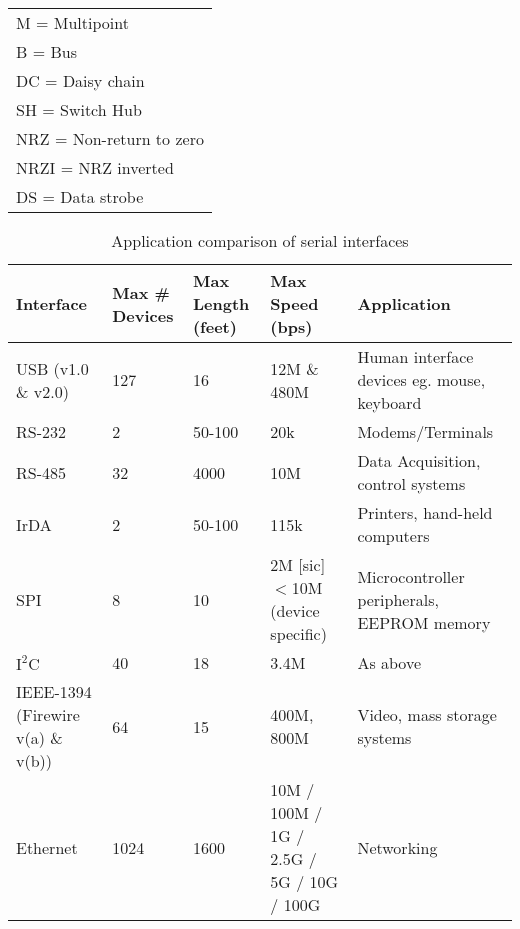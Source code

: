 \begin{table}[H]
\begin{center}
\begin{tabular} { | m{4cm} | m{1cm} | m{1cm} | m{2.5cm} | m{1cm} | m{1cm} | m{1.5cm} | }
        \multicolumn{7}{l}{M = Multipoint}\\
        \multicolumn{7}{l}{B = Bus}\\
        \multicolumn{7}{l}{DC = Daisy chain}\\
        \multicolumn{7}{l}{SH = Switch Hub}\\
        \multicolumn{7}{l}{NRZ = Non-return to zero}\\
        \multicolumn{7}{l}{NRZI = NRZ inverted}\\
        \multicolumn{7}{l}{DS = Data strobe}\\
        \end{tabular}
    \end{center}
\end{table}

\begin{table}[H]
    \caption{Application comparison of serial interfaces}
    \label{table:serial-app-comp}
    \begin{center}
        \begin{tabular} { | m{3cm} | m{2cm} | m{2cm} | m{2cm} | m{5cm} | }
        \hline
        Interface & Max \# Devices & Max Length (feet) & Max Speed (bps) & Application\\
        \hline
        USB (v1.0 \& v2.0) & 127 & 16 & 12M \& 480M & Human interface devices eg. mouse, keyboard\\
        \hline
        RS-232 & 2 & 50-100 & 20k & Modems/Terminals\\
        \hline
        RS-485 & 32 & 4000 & 10M & Data Acquisition, control systems\\
        \hline
        IrDA & 2 & 50-100 & 115k & Printers, hand-held computers\\
        \hline
        SPI & 8 & 10 & 2M [sic] $<$10M (device specific) & Microcontroller peripherals, EEPROM
        memory\\
        \hline
        $\textrm{I}^2\textrm{C}$ & 40 & 18 & 3.4M & As above\\
        \hline
        IEEE-1394 {\small (Firewire v(a) \& v(b))} & 64 & 15 & 400M, 800M & Video, mass storage
        systems\\
        \hline
        Ethernet & 1024 & 1600 & 10M / 100M / 1G / 2.5G / 5G / 10G / 100G & Networking\\
        \hline
        \end{tabular}
    \end{center}
\end{table}
